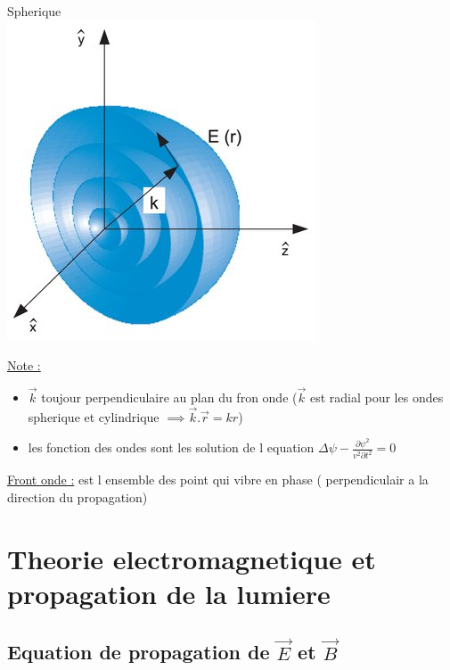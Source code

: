 \documentclass[12pt]{book}
\begin{document}
            \begin{minipage}{0.49\linewidth}
                Spherique \\
                \includegraphics[width =\linewidth]{pic/spherique.jpg}
            \end{minipage}
            
            \underline{Note :} 
                \begin{itemize}
                    \item $\vec{k}$ toujour perpendiculaire au plan du fron onde ($\vec{k}$ est radial pour les ondes spherique et cylindrique $\implies \vec{k}.\vec{r}=kr$) 
                    \item les fonction des ondes sont les solution de l equation $\Delta \psi - \frac{\partial \psi^2}{v^2 \partial t^2} =0$ 
                \end{itemize}
            \underline{Front onde :} est l ensemble des point qui vibre en phase ( perpendiculair a la direction du propagation)

    \chapter{Theorie electromagnetique et propagation de la lumiere}
        \section{Equation de propagation de $\vec{E}$ et $\vec{B}$ }
\end{document}
